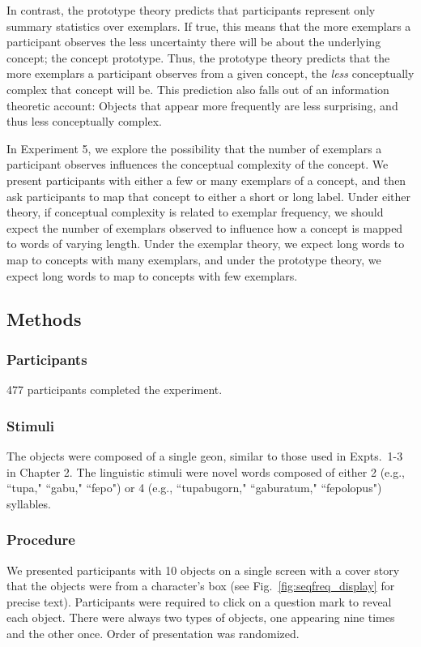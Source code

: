 In contrast, the prototype theory predicts that participants represent only summary statistics over exemplars. If true, this means that the more exemplars a participant observes the less uncertainty there will be about the underlying concept; the concept prototype. Thus, the prototype theory predicts that the more exemplars a participant observes from a given concept, the {\it less} conceptually complex that concept will be. This prediction also falls out of an information theoretic account: Objects that appear more frequently are less surprising, and thus less conceptually complex.

In Experiment 5, we explore the possibility that the number of exemplars a participant observes influences the conceptual complexity of the concept. We present participants with either a few or many exemplars of a concept, and then ask participants to map that concept to either a short or long label. Under either theory, if conceptual complexity is related to exemplar frequency, we should expect the number of exemplars observed to influence how a concept is mapped to words of varying length. Under the exemplar theory, we expect long words to map to concepts with many exemplars, and under the prototype theory, we expect long words to map to concepts with few exemplars.

\subsection{Methods}
\subsubsection{Participants} 
477 participants completed the experiment.
\subsubsection{Stimuli} 
The objects were composed of a single geon, similar to those used in Expts.\ 1-3 in Chapter 2. The linguistic stimuli were novel words composed of either 2 (e.g., ``tupa," ``gabu," ``fepo")  or 4  (e.g., ``tupabugorn," ``gaburatum," ``fepolopus")  syllables.

\subsubsection{Procedure}
We presented participants with 10 objects on a single screen with a cover story that the objects were from a character's box (see Fig.\ \ref{fig:seqfreq_display} for precise text). Participants were required to click on a question mark to reveal each object. There were always two types of objects, one appearing nine times and the other once. Order of presentation was randomized.

